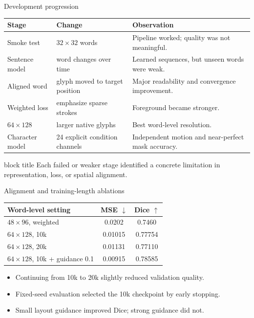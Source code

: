 \documentclass[aspectratio=169,xcolor=svgnames]{beamer}
\newcommand{\keypoint}[1]{%
\begin{center}
\begin{beamercolorbox}[rounded=true,shadow=true,wd=0.88\textwidth,sep=0.6em,center]{block title}
#1
\end{beamercolorbox}
\end{center}
}
\begin{document}
\begin{frame}{Development progression}
\begin{center}
\begin{tabular}{p{2.2cm}p{3.2cm}p{5.6cm}}
\hline
Stage & Change & Observation \\
\hline
Smoke test & $32\times32$ words & Pipeline worked; quality was not meaningful. \\
Sentence model & word changes over time & Learned sequences, but unseen words were weak. \\
Aligned word & glyph moved to target position & Major readability and convergence improvement. \\
Weighted loss & emphasize sparse strokes & Foreground became stronger. \\
$64\times128$ & larger native glyphs & Best word-level resolution. \\
Character model & 24 explicit condition channels & Independent motion and near-perfect mask accuracy. \\
\hline
\end{tabular}
\end{center}

\keypoint{Each failed or weaker stage identified a concrete limitation in representation, loss, or spatial alignment.}
\end{frame}

\begin{frame}{Alignment and training-length ablations}
\begin{center}
\begin{tabular}{lcc}
\hline
Word-level setting & MSE $\downarrow$ & Dice $\uparrow$ \\
\hline
$48\times96$, weighted & 0.0202 & 0.7460 \\
$64\times128$, 10k & 0.01015 & 0.77754 \\
$64\times128$, 20k & 0.01131 & 0.77110 \\
$64\times128$, 10k + guidance 0.1 & 0.00915 & 0.78585 \\
\hline
\end{tabular}
\end{center}

\begin{itemize}
    \item Continuing from 10k to 20k slightly reduced validation quality.
    \item Fixed-seed evaluation selected the 10k checkpoint by early stopping.
    \item Small layout guidance improved Dice; strong guidance did not.
\end{itemize}
\end{frame}
\end{document}
